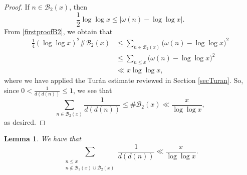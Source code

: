 \documentclass[12pt]{article}
\newtheorem{lemma}{Lemma}%
\begin{document}
\begin{proof}
 If \(n\in\mathcal{B}_2(x)\), then
\begin{equation}\label{firstproofB2}
 \frac12\log\log x \leq \left|\omega(n)-\log\log x\right|. 
\end{equation}
 From  \eqref{firstproofB2}, we   obtain that
\begin{align*}
 \frac{1}{4} (\log \log x)^{2} \# \mathcal{B}_{2}(x) 
 & \leq \sum_{n \in \mathcal{B}_{2}(x)} \big( \omega(n) - \log \log x \big)^{2} \\ 
 & \leq \sum_{n \leq x} \big( \omega(n) - \log \log x \big)^{2} \\ 
 & \ll x \log \log x, 
\end{align*}
 where we have applied the Tur\'{a}n estimate reviewed in Section \ref{secTuran}. So, since \(0 < \frac{1}{d(d(n))} \leq 1\), we see that 
$$ \sum_{n\in\mathcal{B}_2(x)}
\frac1{d(d(n))}
\leq \#\mathcal{B}_2(x)
\ll \frac{x}{\log\log x}, $$
 as desired. 
\end{proof}

\begin{lemma}\label{LemmaComplement}
We have that 
$$ \sum_{\substack{n\leq x\\
n\notin \mathcal{B}_1(x) \cup \mathcal{B}_2(x)}}
\frac1{d(d(n))} \ll
\frac{x}{\log\log x}. $$
\end{lemma}
\end{document}
